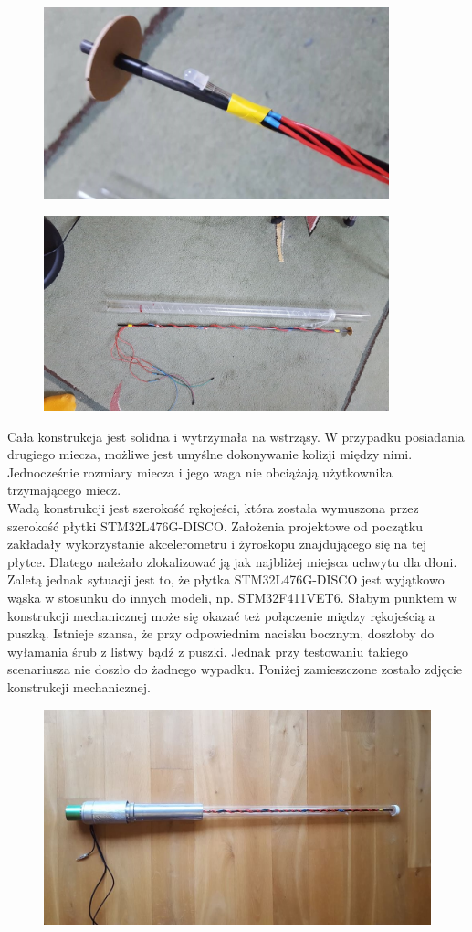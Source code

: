 \documentclass[10pt, a4paper]{article}
\begin{document}
	\begin{figure}[H]
	\centering
	\includegraphics[width=100mm]{3.jpg}
	\end{figure}
		\begin{figure}[H]
	\centering
	\includegraphics[width=100mm]{2.jpg}
	\end{figure}
Cała konstrukcja jest solidna i wytrzymała na wstrząsy. W przypadku posiadania drugiego miecza, możliwe jest umyślne dokonywanie kolizji między nimi. Jednocześnie rozmiary miecza i jego waga nie obciążają użytkownika trzymającego miecz. \\

Wadą konstrukcji jest szerokość rękojeści, która została wymuszona przez szerokość płytki STM32L476G-DISCO. Założenia projektowe od początku zakładały wykorzystanie akcelerometru i żyroskopu znajdującego się na tej płytce. Dlatego należało zlokalizować ją jak najbliżej miejsca uchwytu dla dłoni. Zaletą jednak sytuacji jest to, że płytka STM32L476G-DISCO jest wyjątkowo wąska w stosunku do innych modeli, np. STM32F411VET6. Słabym punktem w konstrukcji mechanicznej może się okazać też połączenie między rękojeścią a puszką. Istnieje szansa, że przy odpowiednim nacisku bocznym, doszłoby do wyłamania śrub z listwy bądź z puszki. Jednak przy testowaniu takiego scenariusza nie doszło do żadnego wypadku. Poniżej zamieszczone zostało zdjęcie konstrukcji mechanicznej.
	\begin{figure}[H]
		\centering
	\includegraphics[width=120mm]{22.jpg}
	\end{figure}
\end{document}
